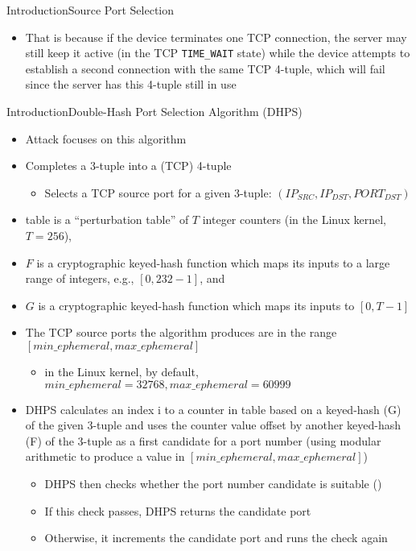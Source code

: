 \documentclass[aspectratio=169, hyperref={colorlinks=true, allcolors=SecondaryColor}, c]{beamer}
\begin{document}
\begin{frame}[fragile]{Introduction}{Source Port Selection}
\begin{itemize}
\begin{itemize}
\begin{itemize}
					\begin{itemize}
						\item That is because if the device terminates one TCP connection, the server may still keep it active (in the TCP \verb|TIME_WAIT| state) while the device attempts to establish a second connection with the same TCP 4-tuple, which will fail since the server has this 4-tuple still in use
					\end{itemize}
				\end{itemize}
			\end{itemize}
		\end{itemize}
	\fi
\end{frame}

\begin{frame}[fragile]{Introduction}{Double-Hash Port Selection Algorithm (DHPS)}
	\ifbeamer
    
	\else
		\begin{itemize}
			\item Attack focuses on this algorithm
			\item Completes a 3-tuple into a (TCP) 4-tuple
			\begin{itemize}
				\item Selects a TCP source port for a given 3-tuple: $(IP_{SRC},IP_{DST},PORT_{DST})$
			\end{itemize}
			\item table is a \enquote{perturbation table} of $T$ integer counters (in the Linux kernel, $T = 256$),
			\item $F$ is a cryptographic keyed-hash function which maps its inputs to a large range of integers, e.g., $[0,232-1]$, and
			\item $G$ is a cryptographic keyed-hash function which maps its inputs to $[0,T-1]$
			\item The TCP source ports the algorithm produces are in the range $[min\_ephemeral,max\_ephemeral]$
			\begin{itemize}
				\item in the Linux kernel, by default, $min\_ephemeral = 32768,max\_ephemeral = 60999$
			\end{itemize}
			\item DHPS calculates an index i to a counter in table based on a keyed-hash (G) of the given 3-tuple and uses the counter value offset by another keyed-hash (F) of the 3-tuple as a first candidate for a port number (using modular arithmetic to produce a value in $[min\_ephemeral,max\_ephemeral]$)
			\begin{itemize}
				\item DHPS then checks whether the port number candidate is suitable ()
				\item If this check passes, DHPS returns the candidate port
				\item Otherwise, it increments the candidate port and runs the check again
			\end{itemize}
		\end{itemize}
	\fi
\end{frame}
\end{document}
